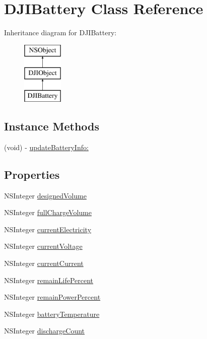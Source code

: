 \hypertarget{interface_d_j_i_battery}{\section{D\+J\+I\+Battery Class Reference}
\label{interface_d_j_i_battery}
}
Inheritance diagram for D\+J\+I\+Battery\+:\begin{figure}[H]
\begin{center}
\leavevmode
\includegraphics[height=3.000000cm]{interface_d_j_i_battery}
\end{center}
\end{figure}
\subsection*{Instance Methods}
\begin{DoxyCompactItemize}
\item 
(void) -\/ \hyperlink{interface_d_j_i_battery_a5e3bd4fe2ad55e276cf14c7624928307}{update\+Battery\+Info\+:}
\end{DoxyCompactItemize}
\subsection*{Properties}
\begin{DoxyCompactItemize}
\item 
N\+S\+Integer \hyperlink{interface_d_j_i_battery_a37e3119e928eaac82f3670cacd3b191e}{designed\+Volume}
\item 
N\+S\+Integer \hyperlink{interface_d_j_i_battery_a87e103436cc4f431bbdc1928cb966326}{full\+Charge\+Volume}
\item 
N\+S\+Integer \hyperlink{interface_d_j_i_battery_a9e00083e9a8276841941d13878dd0280}{current\+Electricity}
\item 
N\+S\+Integer \hyperlink{interface_d_j_i_battery_a2cdaf2d785248e9ce20908bed4fbd2a9}{current\+Voltage}
\item 
N\+S\+Integer \hyperlink{interface_d_j_i_battery_a15cb9aa7a65f755d4822a1bbfd095496}{current\+Current}
\item 
N\+S\+Integer \hyperlink{interface_d_j_i_battery_a254d1b5afd5e99b82f8d18598b840b8f}{remain\+Life\+Percent}
\item 
N\+S\+Integer \hyperlink{interface_d_j_i_battery_a79eeca54fbd09a177ae67d1173d70396}{remain\+Power\+Percent}
\item 
N\+S\+Integer \hyperlink{interface_d_j_i_battery_a592f495cbb583ec4aa4a1323605f53b0}{battery\+Temperature}
\item 
N\+S\+Integer \hyperlink{interface_d_j_i_battery_a5f1acd23e4218474087ef29e2b8c3bb3}{discharge\+Count}
\end{DoxyCompactItemize}


